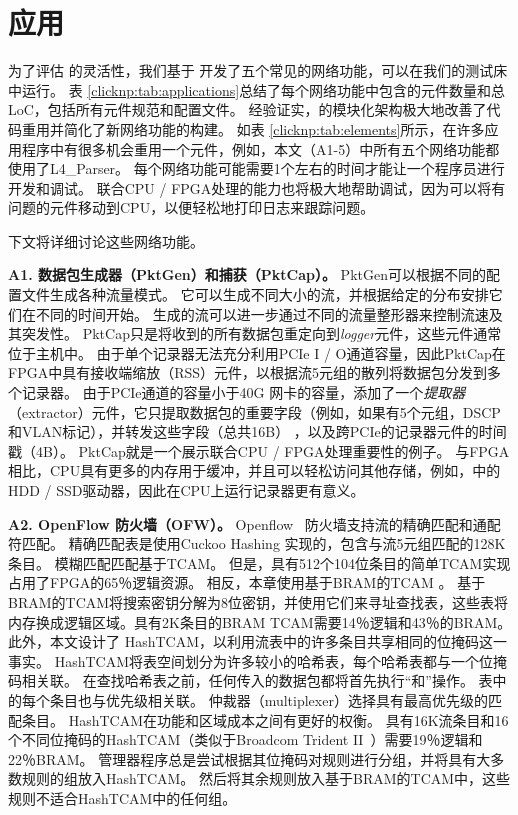 \section{应用}
\label{clicknp:sec:application}

为了评估 \name 的灵活性，我们基于 \name 开发了五个常见的网络功能，可以在我们的测试床中运行。
表 \ref {clicknp:tab:applications}总结了每个网络功能中包含的元件数量和总LoC，包括所有元件规范和配置文件。
经验证实，\name 的模块化架构极大地改善了代码重用并简化了新网络功能的构建。
如表 \ref {clicknp:tab:elements}所示，在许多应用程序中有很多机会重用一个元件，例如，本文（A1-5）中所有五个网络功能都使用了L4\_Parser。
每个网络功能可能需要1个左右的时间才能让一个程序员进行开发和调试。
联合CPU / FPGA处理的能力也将极大地帮助调试，因为可以将有问题的元件移动到CPU，以便轻松地打印日志来跟踪问题。

下文将详细讨论这些网络功能。

\textbf {A1. 数据包生成器（PktGen）和捕获（PktCap）。}
PktGen可以根据不同的配置文件生成各种流量模式。
它可以生成不同大小的流，并根据给定的分布安排它们在不同的时间开始。
生成的流可以进一步通过不同的流量整形器来控制流速及其突发性。
PktCap只是将收到的所有数据包重定向到\textit {logger}元件，这些元件通常位于主机中。
由于单个记录器无法充分利用PCIe I / O通道容量，因此PktCap在FPGA中具有接收端缩放（RSS）元件，以根据流5元组的散列将数据包分发到多个记录器。
由于PCIe通道的容量小于40G 网卡的容量，添加了一个\textit {提取器}（extractor）元件，它只提取数据包的重要字段（例如，如果有5个元组，DSCP和VLAN标记），并转发这些字段（总共16B） ，以及跨PCIe的记录器元件的时间戳（4B）。
PktCap就是一个展示联合CPU / FPGA处理重要性的例子。
与FPGA相比，CPU具有更多的内存用于缓冲，并且可以轻松访问其他存储，例如，\cite{lee2015flosis}中的HDD / SSD驱动器，因此在CPU上运行记录器更有意义。


\textbf {A2. OpenFlow 防火墙（OFW）。}
Openflow~\cite {mckeown2008openflow} 防火墙支持流的精确匹配和通配符匹配。
精确匹配表是使用Cuckoo Hashing \cite{cuckoo} 实现的，包含与流5元组匹配的128K条目。
模糊匹配匹配基于TCAM。
但是，具有512个104位条目的简单TCAM实现占用了FPGA的65％逻辑资源。
相反，本章使用基于BRAM的TCAM \cite {jiang2013scalable}。
基于BRAM的TCAM将搜索密钥分解为8位密钥，并使用它们来寻址查找表，这些表将内存换成逻辑区域。具有2K条目的BRAM TCAM需要14％逻辑和43％的BRAM。
此外，本文设计了 HashTCAM，以利用流表中的许多条目共享相同的位掩码这一事实。
HashTCAM将表空间划分为许多较小的哈希表，每个哈希表都与一个位掩码相关联。
在查找哈希表之前，任何传入的数据包都将首先执行“和”操作。
表中的每个条目也与优先级相关联。
仲裁器（multiplexer）选择具有最高优先级的匹配条目。
HashTCAM在功能和区域成本之间有更好的权衡。
具有16K流条目和16个不同位掩码的HashTCAM（类似于Broadcom Trident II~\cite {broadcomethernet}）需要19％逻辑和22％BRAM。
管理器程序总是尝试根据其位掩码对规则进行分组，并将具有大多数规则的组放入HashTCAM。
然后将其余规则放入基于BRAM的TCAM中，这些规则不适合HashTCAM中的任何组。


